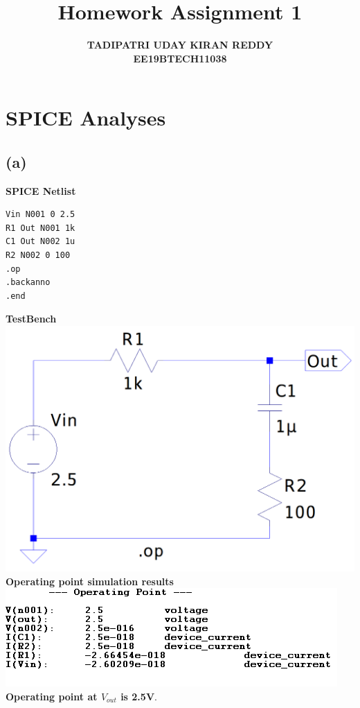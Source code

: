 \documentclass{article}
\begin{document}
\title{\textbf{Homework Assignment 1}}
\author{\textbf{TADIPATRI UDAY KIRAN REDDY}\\\textbf{EE19BTECH11038}}
\maketitle

\section{SPICE Analyses}
\subsection*{(a)}
\textbf{SPICE Netlist}
\begin{lstlisting}
Vin N001 0 2.5
R1 Out N001 1k
C1 Out N002 1u
R2 N002 0 100
.op
.backanno
.end
\end{lstlisting}
\textbf{TestBench}\\
\includegraphics[scale=0.2]{./figs/Q1_a_tb.png}\\
\textbf{Operating point simulation results}\\
\includegraphics[scale=0.7]{./figs/Q1_a_op.png}\\
\textbf{Operating point at $V_{out}$ is 2.5V}.
\end{document}
